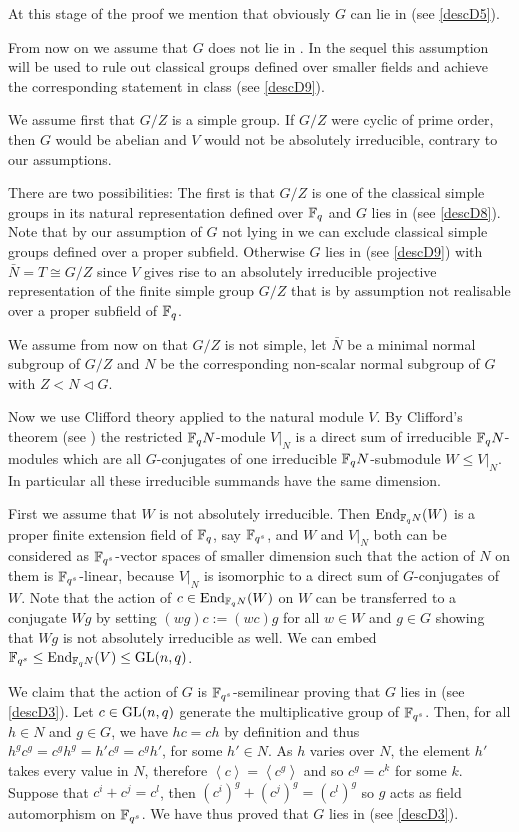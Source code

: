 At this stage of the proof we mention that obviously $G$ can lie
in  (see \ref{descD5}).

From now on we assume that $G$ does not lie in . In the sequel this 
assumption will be used to rule out classical groups defined over
smaller fields and achieve the corresponding statement in class 
(see \ref{descD9}).

We assume first that $G/Z$ is a simple group. If $G/Z$ were cyclic of prime 
order, then $G$ would be abelian and $V$ would not be absolutely
irreducible, contrary to our assumptions.

There are two possibilities:
The first is that $G/Z$ is one of the
classical simple groups in its natural representation defined over $\mathbb{F}_q$
and $G$ lies in  (see
\ref{descD8}). Note that by our assumption of $G$ not lying in  we can
exclude classical simple groups defined over a proper subfield. Otherwise
$G$ lies in  (see \ref{descD9}) with
$\bar N =T \cong G/Z$ since $V$ gives rise to an absolutely irreducible
projective representation of the finite simple group $G/Z$ that
is by assumption not realisable over a proper subfield of $\mathbb{F}_q$.

We assume from now on that $G/Z$ is not simple, let $\bar N$
be a minimal normal subgroup of $G/Z$ and $N$ be
the corresponding non-scalar normal subgroup of $G$ with $Z < N
\triangleleft G$.

Now we use Clifford theory applied to the natural module $V$. By Clifford's
theorem (see \cite[(49.2) and (49.7)]{CR0}) the restricted $\mathbb{F}_q N$-module
$V|_N$ is a direct sum of irreducible $\mathbb{F}_q N$-modules which are all
$G$-conjugates of one irreducible $\mathbb{F}_q N$-submodule $W \le V|_N$. In
particular all these irreducible summands have the same dimension. 

First we assume that $W$ is not absolutely irreducible.
Then $\End_{\F_q N}(W)$ is a proper finite
extension field of $\mathbb{F}_q$, say $\mathbb{F}_{q^s}$, and $W$ and $V|_N$
both can be considered as $\mathbb{F}_{q^s}$-vector spaces of smaller dimension
such that the action of
$N$ on them is $\mathbb{F}_{q^s}$-linear, because $V|_N$ is isomorphic to a direct
sum of $G$-conjugates of $W$. Note that the action of $c \in \End_{\F_q
N}(W)$ on $W$ can be transferred to a conjugate $Wg$ by setting
$(wg)c := (wc)g$ for all $w \in W$ and $g \in G$ showing that $Wg$ is
not absolutely irreducible as well.  
We can embed $\F_{q^s} \le \End_{\F_q N}(V) \le \GL(n,q)$.

We claim that the action of $G$ is $\mathbb{F}_{q^s}$-semilinear proving that $G$ lies
in  (see \ref{descD3}). Let $c \in \GL(n,q)$ generate the
multiplicative group of $\mathbb{F}_{q^s}$. Then, for all $h \in N$ and $g
\in G$, we have $hc=ch$ by definition and thus $h^g c^g = c^g h^g =
h' c^g = c^g h'$, for some $h' \in N$. As $h$ varies over $N$, the
element $h'$ takes every value in $N$, therefore $\left< c \right>
= \left< c^g \right>$ and so $c^g = c^k$ for some $k$. Suppose that
$c^i + c^j = c^l$, then $(c^i)^g + (c^j)^g = (c^l)^g$ so $g$ acts as
field automorphism on $\mathbb{F}_{q^s}$. We have thus proved that $G$ 
lies in  (see \ref{descD3}).

